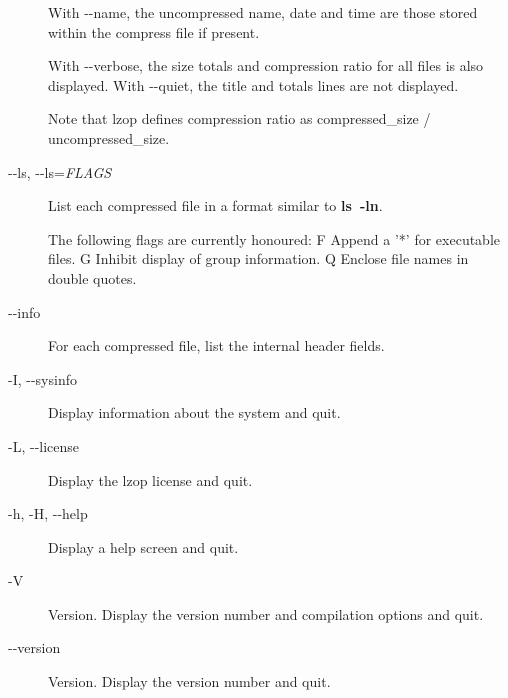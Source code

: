 \begin{description}
With -{}-name, the uncompressed name, date and time
are those stored within the compress file if present.



With -{}-verbose, the size totals and compression
ratio for all files is also displayed. With
-{}-quiet, the title and totals lines are not displayed.



Note that lzop defines compression ratio
as compressed\_size / uncompressed\_size.


\item[{-{}-ls, -{}-ls=\textit{FLAGS}}] \mbox{}

List each compressed file in a format similar to \textbf{ls~-ln}.



The following flags are currently honoured:
  F  Append a '*' for executable files.
  G  Inhibit display of group information.
  Q  Enclose file names in double quotes.


\item[{-{}-info}] \mbox{}

For each compressed file, list the internal header fields.


\item[{-I, -{}-sysinfo}] \mbox{}

Display information about the system and quit.


\item[{-L, -{}-license}] \mbox{}

Display the lzop license and quit.


\item[{-h, -H, -{}-help}] \mbox{}

Display a help screen and quit.


\item[{-V}] \mbox{}

Version. Display the version number and compilation
options and quit.


\item[{-{}-version}] \mbox{}

Version. Display the version number and quit.

\end{description}
